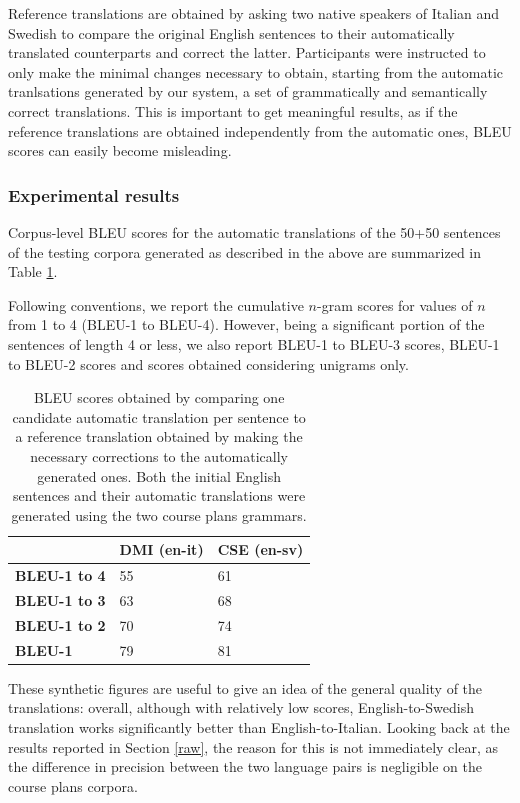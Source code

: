 \documentclass[11pt]{article}
\begin{document}
Reference translations are obtained by asking two native speakers of Italian and Swedish to compare the original English sentences to their automatically translated counterparts and correct the latter.
Participants were instructed to only make the minimal changes necessary to obtain, starting from the automatic tranlsations generated by our system, a set of grammatically and semantically correct translations. 
This is important to get meaningful results, as if the reference translations are obtained independently from the automatic ones, BLEU scores can easily become misleading.

\subsubsection{Experimental results}
Corpus-level BLEU scores for the automatic translations of the 50+50 sentences of the testing corpora generated as described in the above are summarized in Table \ref{tableu}.

Following conventions, we report the cumulative $n$-gram scores for values of $n$ from 1 to 4 (BLEU-1 to BLEU-4). 
However, being a significant portion of the sentences of length 4 or less, we also report BLEU-1 to BLEU-3 scores, BLEU-1 to BLEU-2 scores and scores obtained considering unigrams only. 

\begin{table}[h]
  \centering
  \begin{tabular}{l|ll}
  \textbf{}            & \textbf{DMI (en-it)} & \textbf{CSE (en-sv)} \\ \hline
  \textbf{BLEU-1 to 4} & 55         & 61         \\ 
  \textbf{BLEU-1 to 3} & 63         & 68         \\ 
  \textbf{BLEU-1 to 2} & 70         & 74          \\
  \textbf{BLEU-1}      & 79         & 81         \\ 
  \end{tabular}
  \caption[BLEU scores for automatic translations based on the course plans grammars]{BLEU scores obtained by comparing one candidate automatic translation per sentence to a reference translation obtained by making the necessary corrections to the automatically generated ones. Both the initial English sentences and their automatic translations were generated using the two course plans grammars.}
  \label{tableu}
\end{table}

These synthetic figures are useful to give an idea of the general quality of the translations: overall, although with relatively low scores, English-to-Swedish translation works significantly better than English-to-Italian. 
Looking back at the results reported in Section \ref{raw}, the reason for this is not immediately clear, as the difference in precision between the two language pairs is negligible on the course plans corpora.
\end{document}
